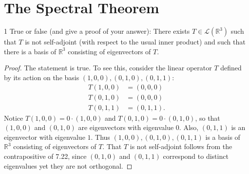 \documentclass{extarticle}
\newenvironment{problem}[1]{\begin{prob*}{#1}{}}{\end{prob*}}
\newcommand{\R}{\mathbb{R}}
\newcommand{\Hom}{\mathcal{L}}
\begin{document}
\section{The Spectral Theorem}

\begin{problem}{1}
True or false (and give a proof of your answer): There exists $T\in\Hom(\R^3)$ such that $T$ is not self-adjoint (with respect to the usual inner product) and such that there is a basis of $\R^3$ consisting of eigenvectors of $T$.
\end{problem}
\begin{proof}
The statement is true.  To see this, consider the linear operator $T$ defined by its action on the basis $(1, 0, 0), (0, 1, 0), (0, 1, 1)$:
\begin{align*}
T(1, 0, 0) &= (0, 0, 0)\\
T(0, 1, 0) &= (0, 0, 0)\\
T(0, 1, 1) &= (0, 1, 1).
\end{align*}
Notice $T(1, 0, 0) = 0\cdot (1, 0, 0)$ and $T(0, 1, 0) = 0\cdot (0, 1, 0)$, so that $(1, 0, 0)$ and $(0, 1, 0)$ are eigenvectors with eigenvalue $0$.  Also, $(0, 1, 1)$ is an eigenvector with eigenvalue $1$.  Thus $(1, 0, 0), (0, 1, 0), (0, 1, 1)$ is a basis of $\R^3$ consisting of eigenvectors of $T$.  That $T$ is not self-adjoint follows from the contrapositive of 7.22, since $(0, 1, 0)$ and $(0, 1, 1)$ correspond to distinct eigenvalues yet they are not orthogonal.
\end{proof}
\end{document}
